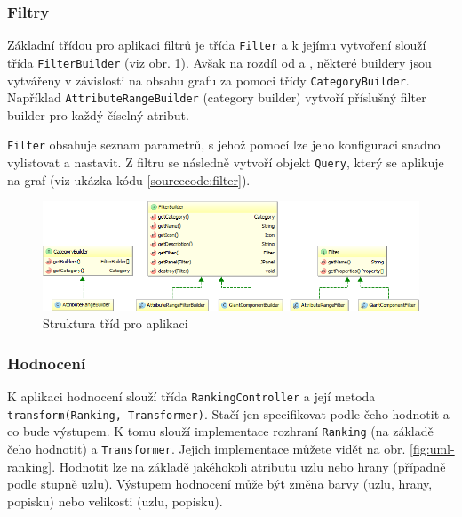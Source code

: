 \documentclass[thesis=M,czech]{FITthesis}[2014/05/6]
\begin{document}
\subsubsection{Filtry}
Základní třídou pro aplikaci filtrů je třída \texttt{Filter} a k jejímu vytvoření slouží třída \texttt{FilterBuilder} (viz obr. \ref{fig:uml-filter}).
Avšak na rozdíl od  a , některé buildery jsou vytvářeny v závislosti na obsahu grafu za pomoci třídy \texttt{CategoryBuilder}.
Například \texttt{AttributeRangeBuilder} (category builder) vytvoří příslušný filter builder pro každý číselný atribut. 

\texttt{Filter} obsahuje seznam parametrů, s jehož pomocí lze jeho konfiguraci snadno vylistovat a nastavit.
Z filtru se následně vytvoří objekt \texttt{Query}, který se aplikuje na graf (viz ukázka kódu \ref{sourcecode:filter}).

\begin{figure}\centering
 	\includegraphics[width=1\textwidth]{images/class-diagram/filter}
 	\caption[Struktura tříd pro výpočet ]{Struktura tříd pro aplikaci }\label{fig:uml-filter}
\end{figure}



\subsubsection{Hodnocení}
K aplikaci hodnocení slouží třída \texttt{RankingController} a její metoda \texttt{trans\-form(Rank\-ing, Trans\-former)}. Stačí jen specifikovat podle čeho hodnotit
a co bude výstupem. K tomu slouží implementace rozhraní \texttt{Ranking} (na základě čeho hodnotit) a \texttt{Transformer}. Jejich implementace můžete vidět na 
obr. \ref{fig:uml-ranking}. Hodnotit lze na základě jakéhokoli atributu uzlu nebo hrany (případně podle stupně uzlu). Výstupem hodnocení může být změna barvy (uzlu, hrany, popisku) 
nebo velikosti (uzlu, popisku).
\end{document}
